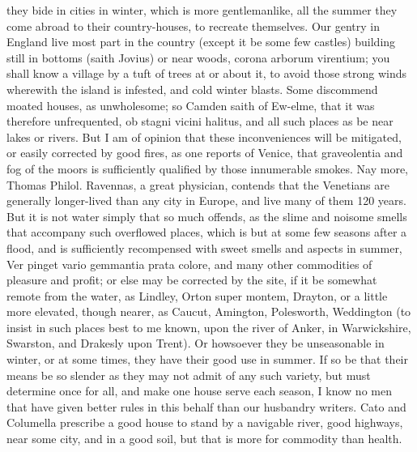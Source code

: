{they bide in cities in winter, which is more gentlemanlike, all the
summer they come abroad to their country-houses, to recreate
themselves. Our gentry in England live most part in the country (except
it be some few castles) building still in bottoms (saith Jovius)
or near woods, corona arborum virentium; you shall know a village by a
tuft of trees at or about it, to avoid those strong winds wherewith the
island is infested, and cold winter blasts. Some discommend moated
houses, as unwholesome; so Camden saith of Ew-elme, that it was
therefore unfrequented, ob stagni vicini halitus, and all such places
as be near lakes or rivers. But I am of opinion that these
inconveniences will be mitigated, or easily corrected by good fires, as
one reports of Venice, that graveolentia and fog of the moors is
sufficiently qualified by those innumerable smokes. Nay more,
Thomas Philol. Ravennas, a great physician, contends that the
Venetians are generally longer-lived than any city in Europe, and live
many of them 120 years. But it is not water simply that so much
offends, as the slime and noisome smells that accompany such overflowed
places, which is but at some few seasons after a flood, and is
sufficiently recompensed with sweet smells and aspects in summer, Ver
pinget vario gemmantia prata colore, and many other commodities of
pleasure and profit; or else may be corrected by the site, if it be
somewhat remote from the water, as Lindley, Orton super montem,
Drayton, or a little more elevated, though nearer, as
Caucut, Amington, Polesworth, Weddington (to
insist in such places best to me known, upon the river of Anker, in
Warwickshire,  Swarston, and Drakesly upon Trent). Or
howsoever they be unseasonable in winter, or at some times, they have
their good use in summer. If so be that their means be so slender as
they may not admit of any such variety, but must determine once for
all, and make one house serve each season, I know no men that have
given better rules in this behalf than our husbandry writers.
Cato and Columella prescribe a good house to stand by a navigable
river, good highways, near some city, and in a good soil, but that is
more for commodity than health.

}
